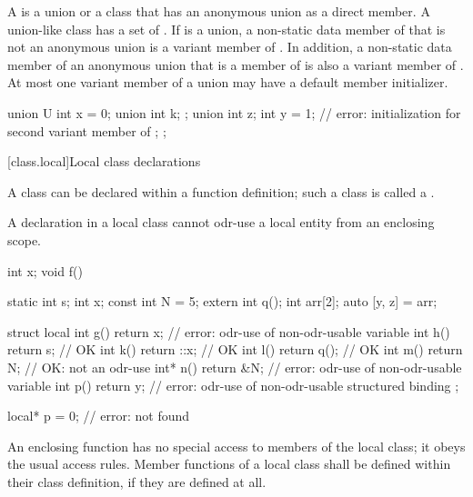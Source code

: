 \pnum
{}%
A  is a union or a class that has an anonymous union as a direct
member. A union-like class  has a set of .
If  is a union, a non-static data member of  that is not an anonymous
union is a variant member of . In addition, a non-static data member of an
anonymous union that is a member of  is also a variant member of .
At most one variant member of a union may have a default member initializer.
\begin{example}
\begin{codeblock}
union U {
  int x = 0;
  union {
    int k;
  };
  union {
    int z;
    int y = 1;      // error: initialization for second variant member of 
  };
};
\end{codeblock}
\end{example}

[class.local]{Local class declarations}
%
%
%

\pnum
A class can be declared within a function definition; such a class is
called a .
\begin{note}
A declaration in a local class
cannot odr-use
a local entity
from an
enclosing scope.
\end{note}
\begin{example}
\begin{codeblock}
int x;
void f() {
  static int s;
  int x;
  const int N = 5;
  extern int q();
  int arr[2];
  auto [y, z] = arr;

  struct local {
    int g() { return x; }       // error: odr-use of non-odr-usable variable 
    int h() { return s; }       // OK
    int k() { return ::x; }     // OK
    int l() { return q(); }     // OK
    int m() { return N; }       // OK: not an odr-use
    int* n() { return &N; }     // error: odr-use of non-odr-usable variable 
    int p() { return y; }       // error: odr-use of non-odr-usable structured binding 
  };
}

local* p = 0;                   // error:  not found
\end{codeblock}
\end{example}

\pnum
An enclosing function has no special access to members of the local
class; it obeys the usual access rules.
%
Member functions of a local class shall be defined within their class
definition, if they are defined at all.

